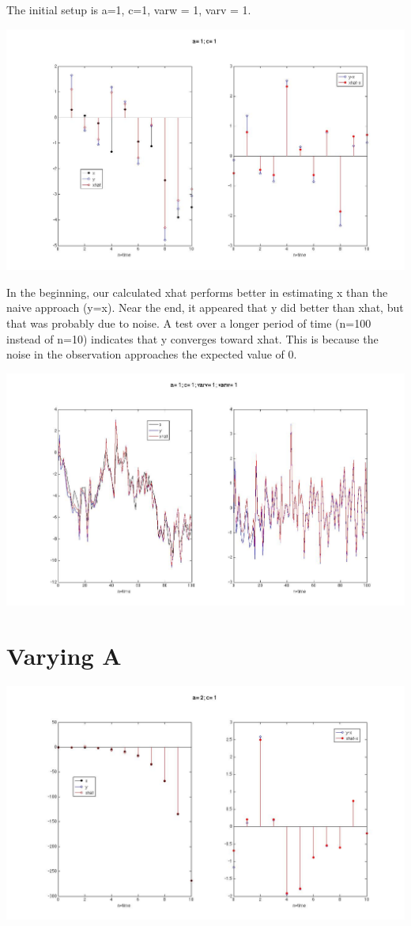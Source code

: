 \documentclass[leqno]{article}
\begin{document}
\pagebreak
The initial setup is a=1, c=1, varw = 1, varv = 1.
\begin{center}\includegraphics[scale=0.3]{fig4}\end{center}
In the beginning, our calculated xhat performs better in estimating x than the naive approach (y=x). Near the end, it appeared that y did better than xhat, but that was probably due to noise. A test over a longer period of time (n=100 instead of n=10) indicates that y converges toward xhat. This is because the noise in the observation approaches the expected value of 0.

\begin{center}\includegraphics[scale=0.3]{fig11}\end{center}
\section{Varying A}
\begin{center}\includegraphics[scale=0.3]{fig1}\end{center}
\end{document}
